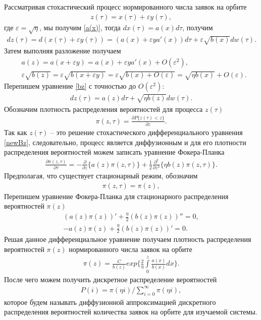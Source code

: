 Рассматривая стохастический процесс нормированного числа заявок на орбите
\begin{align}
	z(\tau)=x(\tau)+\varepsilon y(\tau),
\end{align}
где $\varepsilon=\sqrt{\eta}$, мы получим  \eqref{a(x)}, тогда  $dx(\tau)=a(x)d\tau$, получим
\begin{align}\label{bz}
	dz(\tau)=d(x(\tau)+\varepsilon y(\tau))=(a(x)+\varepsilon ya'(x))d\tau+\varepsilon \sqrt{b(x)}dw(\tau).
\end{align}
Затем выполняя разложение получаем
\begin{align*}
	&a(z)=a(x+\varepsilon y)=a(x)+\varepsilon y a'(x)+O(\varepsilon^2),\\
	&\varepsilon\sqrt{b(z)}=\varepsilon\sqrt{b(x+\varepsilon y)}=\varepsilon\sqrt{b(x)+O(\varepsilon)}=\sqrt{\eta b(x)}+O(\varepsilon).
\end{align*}
Перепишем уравнение \eqref{bz} с точностью до $O(\varepsilon^2)$:
\begin{align}\label{newBz}
	dz(\tau)=a(z)d\tau+\sqrt{\eta b(z)}dw(\tau).
\end{align}
Обозначим плотность распределения вероятностей для процесса $z(\tau)$
\begin{align*}
	\pi(z,\tau)=\frac{\partial P\{z(\tau)<z\}}{\partial z}.
\end{align*}
Так как $z(\tau)$ -- это решение стохастического дифференциального уравнения \eqref{newBz}, следовательно, процесс является диффузионным и для его плотности распределения вероятностей можем записать уравнение Фокера-Планка
\begin{align}
	\frac{\partial \pi (z,\tau)}{\partial \tau}=-\frac{\partial}{\partial z}\{a(z)\pi(z,\tau)\} 
	+\frac{1}{2}\frac{\partial^2}{\partial z^2}\{\eta b(z)\pi(z,\tau)\}.
\end{align}
Предполагая, что существует стационарный режим, обозначим 
\begin{align}
	\pi (z,\tau)=\pi(z),
\end{align}
Перепишем уравнение Фокера-Планка для стационарного распределения вероятностей $\pi{(z)}$
\begin{align*}
	(a(z)\pi(z))'+\frac{\eta}{2}(b(z)\pi(z))''=0,\\
	-a(z)\pi(z)+\frac{\eta}{2}(b(z)\pi(z))'=0.
\end{align*}
Решая данное дифференциальное уравнение получаем плотность распределения вероятностей $\pi{(z)}$ нормированного числа заявок на орбите
\begin{align}
	\pi (z)= \frac{C}{b(z)}exp\bigg\{\frac{2}{\eta} \int\limits_0^z \frac{a(x)}{b(x)}dx\bigg\}.
\end{align} 
После чего можем получить дискретное распределение вероятностей
\begin{align}
	P(i)=\pi(\eta i)/\sum\limits_{i=0}^{\infty} \pi(\eta i),
\end{align} 
которое будем называть диффузионной аппроксимацией дискретного распределения вероятностей количества заявок на орбите для изучаемой системы.
